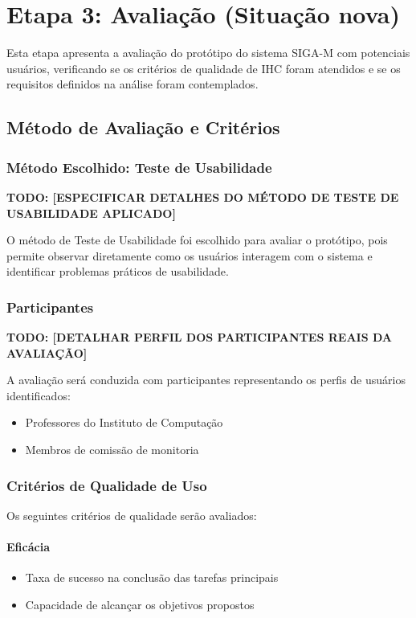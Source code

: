 \documentclass[12pt, a4paper]{report}
\begin{document}
\chapter{Etapa 3: Avaliação (Situação nova)}
\label{ch:avaliacao}

Esta etapa apresenta a avaliação do protótipo do sistema SIGA-M com potenciais usuários, verificando se os critérios de qualidade de IHC foram atendidos e se os requisitos definidos na análise foram contemplados.

\section{Método de Avaliação e Critérios}

\subsection{Método Escolhido: Teste de Usabilidade}

\textbf{TODO: [ESPECIFICAR DETALHES DO MÉTODO DE TESTE DE USABILIDADE APLICADO]}

O método de Teste de Usabilidade foi escolhido para avaliar o protótipo, pois permite observar diretamente como os usuários interagem com o sistema e identificar problemas práticos de usabilidade.

\subsection{Participantes}

\textbf{TODO: [DETALHAR PERFIL DOS PARTICIPANTES REAIS DA AVALIAÇÃO]}

A avaliação será conduzida com participantes representando os perfis de usuários identificados:
\begin{itemize}
    \item Professores do Instituto de Computação
    \item Membros de comissão de monitoria
\end{itemize}

\subsection{Critérios de Qualidade de Uso}

Os seguintes critérios de qualidade serão avaliados:

\subsubsection{Eficácia}
\begin{itemize}
    \item Taxa de sucesso na conclusão das tarefas principais
    \item Capacidade de alcançar os objetivos propostos
\end{itemize}
\end{document}
